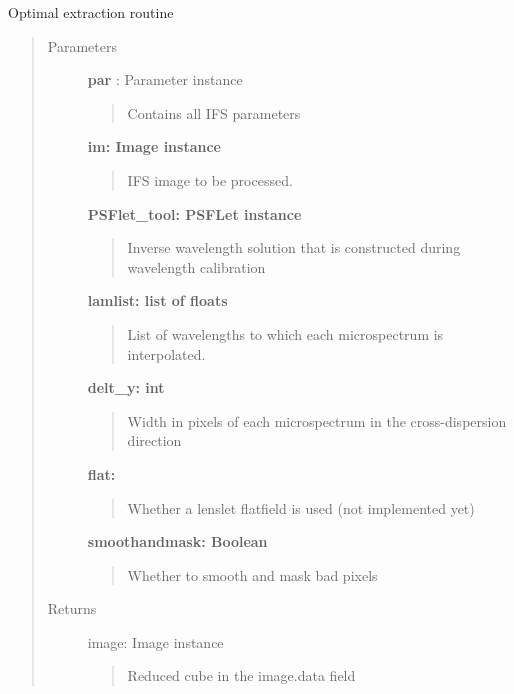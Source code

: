 \documentclass[letterpaper,10pt,english]{sphinxmanual}
\begin{document}
\begin{fulllineitems}
\label{tools:tools.reduction.fitspec_intpix}
Optimal extraction routine
\begin{quote}\begin{description}
\item[{Parameters}] \leavevmode
\textbf{par} :   Parameter instance
\begin{quote}

Contains all IFS parameters
\end{quote}

\textbf{im:     Image instance}
\begin{quote}

IFS image to be processed.
\end{quote}

\textbf{PSFlet\_tool: PSFLet instance}
\begin{quote}

Inverse wavelength solution that is constructed during wavelength calibration
\end{quote}

\textbf{lamlist: list of floats}
\begin{quote}

List of wavelengths to which each microspectrum is interpolated.
\end{quote}

\textbf{delt\_y: int}
\begin{quote}

Width in pixels of each microspectrum in the cross-dispersion direction
\end{quote}

\textbf{flat:}
\begin{quote}

Whether a lenslet flatfield is used (not implemented yet)
\end{quote}

\textbf{smoothandmask: Boolean}
\begin{quote}

Whether to smooth and mask bad pixels
\end{quote}

\item[{Returns}] \leavevmode
image:  Image instance
\begin{quote}

Reduced cube in the image.data field
\end{quote}

\end{description}\end{quote}

\end{fulllineitems}
\end{document}
